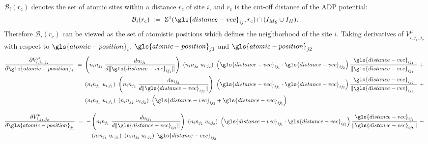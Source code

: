 \documentclass{article}
\begin{document}
$\mathcal{B}_i(r_\text{c})$ denotes the set of atomic sites within a distance $r_c$ of site $i$, and $r_\text{c}$ is the cut-off distance of the ADP potential:
\begin{equation}
    \mathcal{B}_i(r_c)\ \coloneqq\ \mathbb{S}^1(\gls{distance-vec}_{ij}, r_c) \cap (I_{Mg} \cup I_{H}).
\end{equation}
Therefore $\mathcal{B}_i(r_\text{c})$ can be viewed as the set of atomistic positions which defines the neighborhood of the site $i$. Taking derivatives of $V^{\mu}_{i,j_1,j_2}$ with respect to $\gls{atomic-position}_i$, $\gls{atomic-position}_{j1}$ and $\gls{atomic-position}_{j2}$
\begin{equation}
\begin{split}
\frac{\partial V^{\mu}_{i,j_1,j_2}}{\partial \gls{atomic-position}_i}\ =\ &\left(n_i n_{j_1}\ \frac{d u_{ij_1}}{ d \| \gls{distance-vec}_{ij_1} \|} \right) \left(n_i n_{j_2}\ u_{i,j_2}\right)\ \left(\gls{distance-vec}_{ij_1} \cdot \gls{distance-vec}_{ij_2} \right) \frac{\gls{distance-vec}_{ij_1}}{\| \gls{distance-vec}_{ij_1} \|}\ +\ \\ 
&\left(n_i n_{j_1}\ u_{i,j_1}\right) \left(n_i n_{j_2}\ \frac{d u_{ij_2}}{ d \| \gls{distance-vec}_{ij_2} \|} \right)\ \left(\gls{distance-vec}_{ij_1} \cdot \gls{distance-vec}_{ij_2} \right) \frac{\gls{distance-vec}_{i j_2}}{\| \gls{distance-vec}_{i j_2} \|}\ +\ \\
&\left(n_i n_{j_1}\ u_{i,j_1}\right) \left(n_i n_{j_2}\ u_{i,j_2}\right)\ \left(\gls{distance-vec}_{ij_2} + \gls{distance-vec}_{ij_1} \right)
\end{split}
\end{equation}

\begin{equation}
\begin{split}
\frac{\partial V^{\mu}_{i,j_1,j_2}}{\partial \gls{atomic-position}_{j_1}}\ =\ - &\left(n_i n_{j_1}\ \frac{d u_{ij_1}}{ d \| \gls{distance-vec}_{ij_1} \|} \right) \left(n_i n_{j_2}\ u_{i,j_2}\right)\ \left(\gls{distance-vec}_{ij_1} \cdot \gls{distance-vec}_{ij_2} \right) \frac{\gls{distance-vec}_{ij_1}}{\| \gls{distance-vec}_{ij_1} \|}\ -\ \\ 
&\left(n_i n_{j_1}\ u_{i,j_1}\right) \left(n_i n_{j_2}\ u_{i,j_2}\right)\ \gls{distance-vec}_{ij_2} 
\end{split}
\end{equation}
\end{document}
